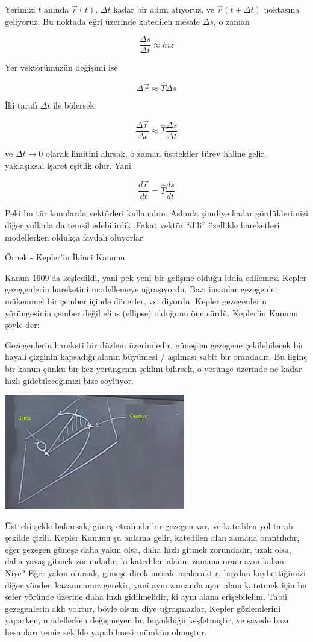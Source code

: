 \documentclass[12pt,fleqn]{article}\usepackage{../../common}
\begin{document}
Yerimizi $t$ anında $\vec{r}(t)$, $\Delta t$ kadar bir adım atıyoruz, ve
$\vec{r}(t+\Delta t)$ noktasına geliyoruz. Bu noktada eğri üzerinde katedilen
mesafe $\Delta s$, o zaman

$$ \frac{\Delta s}{\Delta t} \approx hız $$

Yer vektörümüzün değişimi ise 

$$ \Delta \vec{r} \approx \hat{T} \Delta s $$

İki tarafı $\Delta t$ ile bölersek 

$$ \frac{\Delta \vec{r}}{\Delta t} \approx \hat{T} \frac{\Delta s}{\Delta t} $$

ve $\Delta t \to 0$ olarak limitini alırsak, o zaman üsttekiler türev
haline gelir, yaklaşıksal işaret eşitlik olur. Yani

$$ \frac{d\vec{r}}{dt} = \hat{T}\frac{ds}{dt} $$

Peki bu tür konularda vektörleri kullanalım. Aslında şimdiye kadar
gördüklerimizi diğer yollarla da temsil edebilirdik. Fakat vektör ``dili''
özellikle hareketleri modellerken oldukça faydalı oluyorlar.

Örnek - Kepler'in İkinci Kanunu

Kanun 1609'da keşfedildi, yani pek yeni bir gelişme olduğu iddia
edilemez. Kepler gezegenlerin hareketini modellemeye uğraşıyordu. Bazı insanlar
gezegenler mükemmel bir çember içinde dönerler, vs. diyordu. Kepler gezegenlerin
yörüngesinin çember değil elips (ellipse) olduğunu öne sürdü. Kepler'in Kanunu
şöyle der:

Gezegenlerin hareketi bir düzlem üzerindedir, güneşten gezegene çekilebilecek
bir hayali çizginin kapsadığı alanın büyümesi / aşılması sabit bir orandadır. Bu
ilginç bir kanun çünkü bir kez yörüngenin şeklini bilirsek, o yörünge üzerinde
ne kadar hızlı gidebileceğimizi bize söylüyor.

\includegraphics[height=5cm]{6_6.png}

Üstteki şekle bakarsak, güneş etrafında bir gezegen var, ve katedilen yol taralı
şekilde çizili. Kepler Kanunu şu anlama gelir, katedilen alan zamana
orantılıdır, eğer gezegen güneşe daha yakın olsa, daha hızlı gitmek zorundadır,
uzak olsa, daha yavaş gitmek zorundadır, ki katedilen alanın zamana oranı aynı
kalsın. Niye? Eğer yakın olursak, güneşe direk mesafe azalacaktır, boydan
kaybettiğimizi diğer yönden kazanmamız gerekir, yani aynı zamanda aynı alanı
katetmek için bu sefer yöründe üzerine daha hızlı gidilmelidir, ki aynı alana
erişebilelim. Tabii gezegenlerin aklı yoktur, böyle olsun diye uğraşmazlar,
Kepler gözlemlerini yaparken, modellerken değişmeyen bu büyüklüğü keşfetmiştir,
ve sayede bazı hesapları temiz sekilde yapabilmesi mümkün olmuştur.
\end{document}
